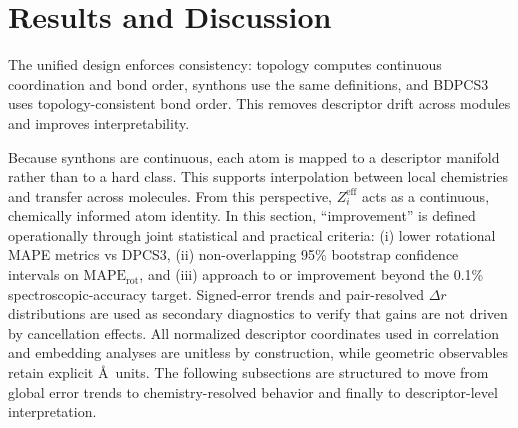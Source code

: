 \documentclass[journal=jctcce,manuscript=article]{achemso}
\begin{document}
\section{Results and Discussion}
The unified design enforces consistency: topology computes continuous coordination and bond order, synthons use the same definitions, and BDPCS3 uses topology-consistent bond order. This removes descriptor drift across modules and improves interpretability.

Because synthons are continuous, each atom is mapped to a descriptor manifold rather than to a hard class. This supports interpolation between local chemistries and transfer across molecules. From this perspective, $Z_i^{\mathrm{eff}}$ acts as a continuous, chemically informed atom identity.
In this section, ``improvement'' is defined operationally through joint statistical and practical criteria: (i) lower rotational MAPE metrics vs DPCS3, (ii) non-overlapping 95\% bootstrap confidence intervals on $\mathrm{MAPE}_{\mathrm{rot}}$, and (iii) approach to or improvement beyond the 0.1\% spectroscopic-accuracy target. Signed-error trends and pair-resolved $\Delta r$ distributions are used as secondary diagnostics to verify that gains are not driven by cancellation effects.
All normalized descriptor coordinates used in correlation and embedding analyses are unitless by construction, while geometric observables retain explicit \AA\ units.
The following subsections are structured to move from global error trends to chemistry-resolved behavior and finally to descriptor-level interpretation.
\end{document}
